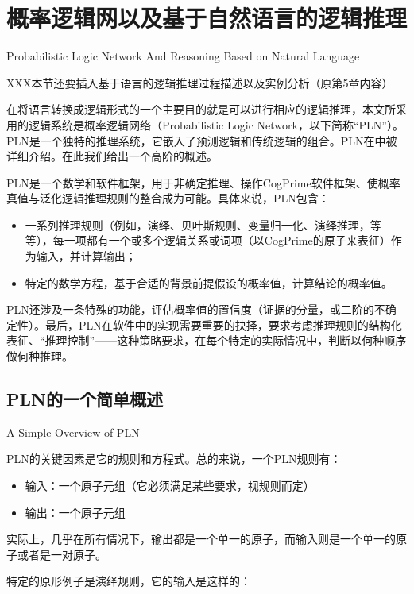 \section{概率逻辑网以及基于自然语言的逻辑推理}{Probabilistic Logic Network And Reasoning Based on Natural Language}
\label{sec:pln}

XXX本节还要插入基于语言的逻辑推理过程描述以及实例分析（原第5章内容）

在将语言转换成逻辑形式的一个主要目的就是可以进行相应的逻辑推理，本文所采用的逻辑系统是概率逻辑网络（Probabilistic Logic Network，以下简称“PLN”）。 PLN是一个独特的推理系统，它嵌入了预测逻辑和传统逻辑的组合。PLN在\cite{Goertzel2008, RWR}中被详细介绍。在此我们给出一个高阶的概述。

PLN是一个数学和软件框架，用于非确定推理、操作CogPrime软件框架、使概率真值与泛化逻辑推理规则的整合成为可能。具体来说，PLN包含：

\begin{itemize}
\item 一系列推理规则（例如，演绎、贝叶斯规则、变量归一化、演绎推理，等等），每一项都有一个或多个逻辑关系或词项（以CogPrime的原子来表征）作为输入，并计算输出；
\item 特定的数学方程，基于合适的背景前提假设的概率值，计算结论的概率值。
\end{itemize}
PLN还涉及一条特殊的功能，评估概率值的置信度（证据的分量，或二阶的不确定性）。最后，PLN在软件中的实现需要重要的抉择，要求考虑推理规则的结构化表征、“推理控制”——这种策略要求，在每个特定的实际情况中，判断以何种顺序做何种推理。

\subsection{PLN的一个简单概述}{A Simple Overview of PLN}

PLN的关键因素是它的规则和方程式。总的来说，一个PLN规则有：

\begin{itemize}
\item 输入：一个原子元组（它必须满足某些要求，视规则而定）
\item 输出：一个原子元组
\end{itemize}

实际上，几乎在所有情况下，输出都是一个单一的原子，而输入则是一个单一的原子或者是一对原子。

特定的原形例子是演绎规则，它的输入是这样的：

